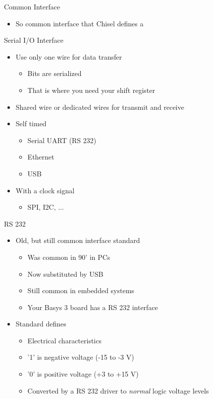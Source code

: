 \begin{frame}[fragile]{Common Interface}
\begin{itemize}
\item So common interface that Chisel defines a 
\end{itemize}
\end{frame}

\begin{frame}[fragile]{Serial I/O Interface}
\begin{itemize}
\item Use only one wire for data transfer
\begin{itemize}
\item Bits are serialized
\item That is where you need your shift register
\end{itemize}
\item Shared wire or dedicated wires for transmit and receive
\item Self timed
\begin{itemize}
\item Serial UART (RS 232)
\item Ethernet
\item USB
\end{itemize}
\item With a clock signal
\begin{itemize}
\item SPI, I2C, ...
\end{itemize}
\end{itemize}
\end{frame}



\begin{frame}[fragile]{RS 232}
\begin{itemize}
\item Old, but still common interface standard
\begin{itemize}
\item Was common in 90' in PCs
\item Now substituted by USB
\item Still common in embedded systems
\item Your Basys 3 board has a RS 232 interface
\end{itemize}
\item Standard defines
\begin{itemize}
\item Electrical characteristics
\item '1' is negative voltage (-15 to -3 V)
\item '0' is positive voltage (+3 to +15 V)
\item Converted by a RS 232 driver to \emph{normal} logic voltage levels
\end{itemize}
\end{itemize}
\end{frame}


